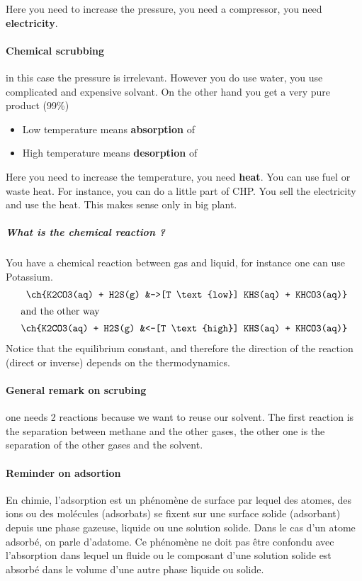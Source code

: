 \documentclass[10pt,a4paper]{article}
\begin{document}
Here you need to increase the pressure, you need a compressor, you need \textbf{electricity}.

\paragraph{Chemical scrubbing} in this case the pressure is irrelevant. However you do use water, you use complicated and expensive solvant. On the other hand you get a very pure product (99\%)

\begin{itemize}
\item Low temperature means \textbf{absorption} of 
\item High temperature means \textbf{desorption} of 
\end{itemize}

Here you need to increase the temperature, you need \textbf{heat}. You can use fuel or waste heat. For instance, you can do a little part of CHP. You sell the electricity and use the heat. This makes sense only in big plant.

\subparagraph{What is the chemical reaction ?} You have a chemical reaction between gas and liquid, for instance one can use Potassium. 
\begin{align*}
\ch{K2CO3(aq) + H2S(g) &->[T \text{low}] KHS(aq) + KHCO3(aq)} \\
\intertext{and the other way}
\ch{K2CO3(aq) + H2S(g) &<-[T \text{high}] KHS(aq) + KHCO3(aq)}
\end{align*}
Notice that the equilibrium constant, and therefore the direction of the reaction (direct or inverse) depends on the thermodynamics.

\paragraph{General remark on scrubing} one needs 2 reactions because we want to reuse our solvent. The first reaction is the separation between methane and the other gases, the other one is the separation of the other gases and the solvent. 
\paragraph{Reminder on \textbf{ad}sortion} En chimie, l’adsorption est un phénomène de surface par lequel des atomes, des ions ou des molécules (adsorbats) se fixent sur une surface solide (adsorbant) depuis une phase gazeuse, liquide ou une solution solide. Dans le cas d'un atome adsorbé, on parle d'adatome. Ce phénomène ne doit pas être confondu avec l'absorption dans lequel un fluide ou le composant d'une solution solide est absorbé dans le volume d'une autre phase liquide ou solide.\cite{wiki_adsortion}
\end{document}
